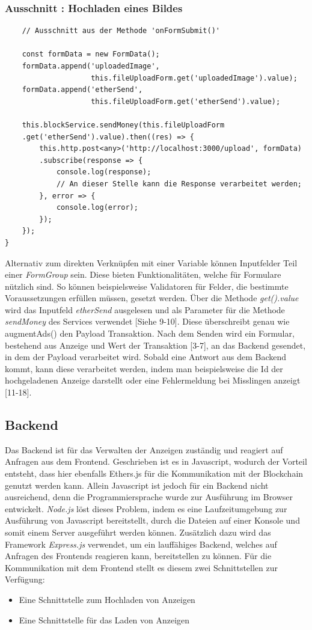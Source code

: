 \subsubsection{Ausschnitt : Hochladen eines Bildes}
\begin{lstlisting}
	// Ausschnitt aus der Methode 'onFormSubmit()'
	
	const formData = new FormData();
	formData.append('uploadedImage', 
					this.fileUploadForm.get('uploadedImage').value);
	formData.append('etherSend', 
					this.fileUploadForm.get('etherSend').value);
	
	this.blockService.sendMoney(this.fileUploadForm
	.get('etherSend').value).then((res) => {
		this.http.post<any>('http://localhost:3000/upload', formData)
		.subscribe(response => {
			console.log(response);
			// An dieser Stelle kann die Response verarbeitet werden;
		}, error => {
			console.log(error);
		});
	});
}
\end{lstlisting}
Alternativ zum direkten Verknüpfen mit einer Variable können Inputfelder Teil einer \emph{FormGroup} sein. Diese bieten Funktionalitäten, welche für Formulare nützlich sind. 
So können beispielsweise Validatoren für Felder, die bestimmte Voraussetzungen erfüllen müssen, gesetzt werden.
Über die Methode \emph{get().value} wird das Inputfeld \emph{etherSend} ausgelesen und als Parameter für die Methode \emph{sendMoney} des Services verwendet [Siehe 9-10]. Diese überschreibt genau wie augmentAds() den Payload Transaktion. Nach dem Senden wird ein Formular, bestehend aus Anzeige und Wert der Transaktion [3-7], an das Backend gesendet, in dem der Payload verarbeitet wird. Sobald eine Antwort aus dem Backend kommt, kann diese verarbeitet werden, indem man beispielsweise die Id der hochgeladenen Anzeige darstellt oder eine Fehlermeldung bei Misslingen anzeigt [11-18].
\subsection{Backend}
Das Backend ist für das Verwalten der Anzeigen zuständig und reagiert auf Anfragen aus dem Frontend. Geschrieben ist es in Javascript, wodurch der Vorteil entsteht, dass hier ebenfalls Ethers.js für die Kommunikation mit der Blockchain genutzt werden kann. Allein Javascript ist jedoch für ein Backend nicht ausreichend, denn die Programmiersprache wurde zur Ausführung im Browser entwickelt. \emph{Node.js} löst dieses Problem, indem es eine Laufzeitumgebung zur Ausführung von Javascript bereitstellt, durch die Dateien auf einer Konsole und somit einem Server ausgeführt werden können. Zusätzlich dazu wird das Framework \emph{Express.js} verwendet, um ein lauffähiges Backend, welches auf Anfragen des Frontends reagieren kann, bereitstellen zu können.
Für die Kommunikation mit dem Frontend stellt es diesem zwei Schnittstellen zur Verfügung: 
\begin{itemize}
	\item Eine Schnittstelle zum Hochladen von Anzeigen
	\item Eine Schnittstelle für das Laden von Anzeigen
\end{itemize}


